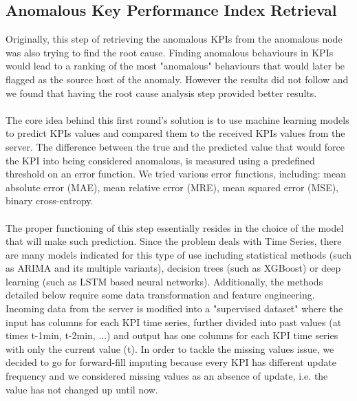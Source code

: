 \documentclass[acmsmall, screen, nonacm]{acmart}
\begin{document}
\subsection{Anomalous Key Performance Index Retrieval}
Originally, this step of retrieving the anomalous KPIs from the anomalous node was also trying to find the root cause. 
Finding anomalous behaviours in KPIs would lead to a ranking of the most "anomalous" behaviours that would later be flagged as the source host of the anomaly. 
However the results did not follow and we found that having the root cause analysis step provided better results. 
\\
\\
The core idea behind this first round's solution is to use machine learning models to predict KPIs values and compared them to the received KPIs values from the server. 
The difference between the true and the predicted value that would force the KPI into being considered anomalous, is measured using a predefined threshold on an error function. 
We tried various error functions, including: mean absolute error (MAE), mean relative error (MRE), mean squared error (MSE), binary cross-entropy.
\\
\\
The proper functioning of this step essentially resides in the choice of the model that will make such prediction. 
Since the problem deals with Time Series, there are many models indicated for this type of use including statistical methods (such as ARIMA and its multiple variants),  decision trees (such as XGBoost) or deep learning (such as LSTM based neural networks). 
Additionally, the methods detailed below require some data transformation and feature engineering. 
Incoming data from the server is modified into a "supervised dataset" where the input has columns for each KPI time series, further divided into past values (at times t-1min, t-2min, ...) and output has one columns for each KPI time series with only the current value (t). 
In order to tackle the missing values issue, we decided to go for forward-fill imputing because every KPI has different update frequency and we considered missing values as an absence of update, i.e. the value has not changed up until now.
\\
\end{document}
